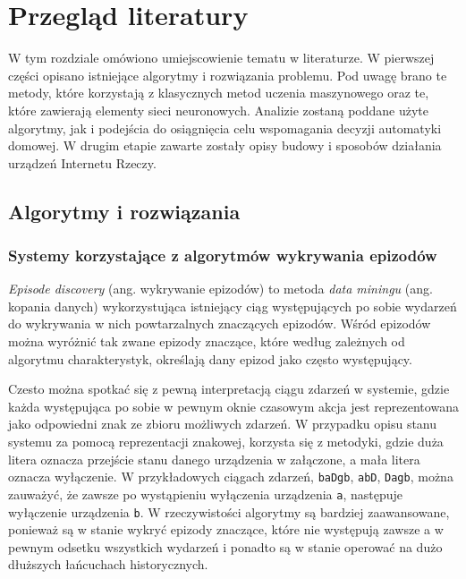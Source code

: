 
\chapter{Przegląd literatury}


W tym rozdziale omówiono umiejscowienie tematu w literaturze. W pierwszej części opisano istniejące algorytmy i rozwiązania problemu. Pod uwagę brano te metody, które korzystają z klasycznych metod uczenia maszynowego oraz te, które zawierają elementy sieci neuronowych. Analizie zostaną poddane użyte algorytmy, jak i podejścia do osiągnięcia celu wspomagania decyzji automatyki domowej. W drugim etapie zawarte zostały opisy budowy i sposobów działania urządzeń Internetu Rzeczy.

\section{Algorytmy i rozwiązania}
\subsection{Systemy korzystające z algorytmów wykrywania epizodów}
\label{subsec:episode_discovery}
\textit{Episode discovery} (ang. wykrywanie epizodów) to metoda \textit{data miningu} (ang. kopania danych) wykorzystująca istniejący ciąg występujących po sobie wydarzeń do wykrywania w nich powtarzalnych znaczących epizodów. Wśród epizodów można wyróżnić tak zwane epizody znaczące, które według zależnych od algorytmu charakterystyk, określają dany epizod jako często występujący.

Czesto można spotkać się z pewną interpretacją ciągu zdarzeń w systemie, gdzie każda występująca po sobie w pewnym oknie czasowym akcja jest reprezentowana jako odpowiedni znak ze zbioru możliwych zdarzeń. W przypadku opisu stanu systemu za pomocą reprezentacji znakowej, korzysta się z metodyki, gdzie duża litera oznacza przejście stanu danego urządzenia w załączone, a mała litera oznacza wyłączenie. W przykładowych ciągach zdarzeń, \verb|baDgb|, \verb|abD|, \verb|Dagb|, można zauważyć, że zawsze po wystąpieniu wyłączenia urządzenia \verb|a|, następuje wyłączenie urządzenia \verb|b|. W rzeczywistości algorytmy są bardziej zaawansowane, ponieważ są w stanie wykryć epizody znaczące, które nie występują zawsze a w pewnym odsetku wszystkich wydarzeń i ponadto są w stanie operować na dużo dłuższych łańcuchach historycznych.

